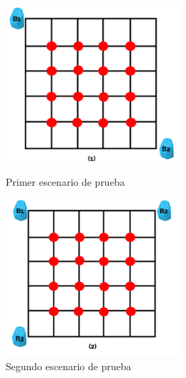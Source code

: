 \begin{figure}[H]
    \centering
    \begin{minipage}[b]{0.45\textwidth}
        \centering
    \includegraphics[width=6.5cm]{figs/dos_apes.png}
        \caption{Primer escenario de prueba}
        \label{fig:escenario1}
    \end{minipage}
    \hfill
    \begin{minipage}[b]{0.45\textwidth}
        \centering
    \includegraphics[width=6.5cm]{figs/tres_apes}
        \caption{Segundo escenario de prueba}
        \label{fig:escenario2}
    \end{minipage}
    
    \vspace{1cm} %
    

\end{figure}
